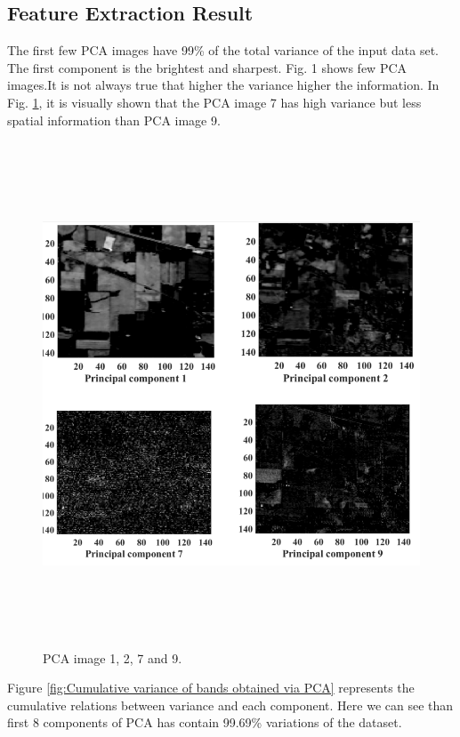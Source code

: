 \documentclass[document.tex]{subfiles}
\begin{document}
\subsection{Feature Extraction Result}
The first few PCA images  have 99\% of the total variance of the input data set. The first component is the brightest and sharpest.
Fig. 1 shows few PCA images.It is not always true that higher the variance higher the information. In Fig. \ref{fig:Some principal components}, it is visually shown that the PCA image 7 has high variance but less spatial information than PCA image 9. 
\begin{figure}[H]
	\begin{center}
		\includegraphics[height=15.0cm]{imgs/PC.png}
	\end{center}
	\caption{PCA image 1, 2, 7 and 9.}
	\label{fig:Some principal components}
\end{figure}
\noindent Figure \ref{fig:Cumulative variance of bands obtained via PCA} represents the cumulative relations between variance and each component. Here we can see than first 8 components of PCA has contain 99.69\% variations of the dataset.
\end{document}
